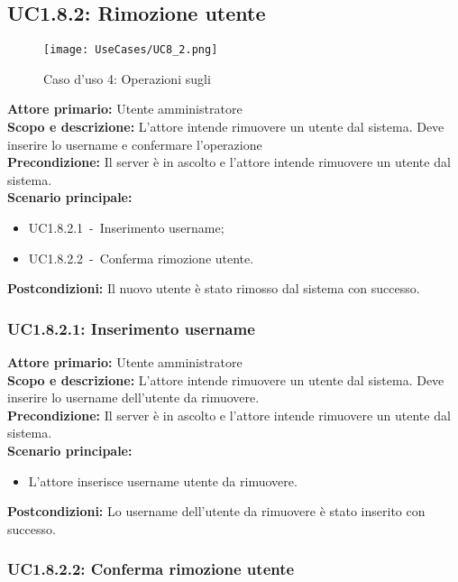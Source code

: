 \documentclass{scalatekids-article}
\begin{document}
\subsection{UC1.8.2: Rimozione utente}

\begin{figure}[H]
  \begin{center}
    \texttt{[image: UseCases/UC8\_2.png]}
    \caption*{Caso d'uso 4: Operazioni sugli }
  \end{center}
\end{figure}
\textbf{Attore primario:} Utente amministratore\\
\textbf{Scopo e descrizione:} L'attore intende rimuovere un utente dal sistema. Deve inserire lo username e confermare l'operazione\\
\textbf{Precondizione:} Il server è in ascolto e l'attore intende rimuovere un utente dal sistema.\\
\textbf{Scenario principale:}
\begin{itemize}
\item UC1.8.2.1\ -\ Inserimento username;
\item UC1.8.2.2\ -\ Conferma rimozione utente.
\end{itemize}
\textbf{Postcondizioni:} Il nuovo utente è stato rimosso dal sistema con successo.

\subsubsection{UC1.8.2.1: Inserimento username}

\textbf{Attore primario:} Utente amministratore\\
\textbf{Scopo e descrizione:} L'attore intende rimuovere un utente dal sistema. Deve inserire lo username dell'utente da rimuovere.\\
\textbf{Precondizione:} Il server è in ascolto e l'attore intende rimuovere un utente dal sistema.\\
\textbf{Scenario principale:}
\begin{itemize}
\item L'attore inserisce username utente da rimuovere.
\end{itemize}
\textbf{Postcondizioni:} Lo username dell'utente da rimuovere è stato inserito con successo.

\subsubsection{UC1.8.2.2: Conferma rimozione utente}
\end{document}
